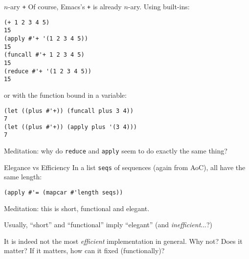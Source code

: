 \documentclass[presentation]{beamer}
\begin{document}
\begin{frame}[fragile]{$n$-ary \texttt{+}}
   Of course, Emacs's \texttt{+} is already $n$-ary.  Using built-ins:
\begin{verbatim}
(+ 1 2 3 4 5)
15
(apply #'+ '(1 2 3 4 5))
15
(funcall #'+ 1 2 3 4 5)
15
(reduce #'+ '(1 2 3 4 5))
15
\end{verbatim}
or with the function bound in a variable:
\begin{verbatim}
(let ((plus #'+)) (funcall plus 3 4))
7
(let ((plus #'+)) (apply plus '(3 4)))
7
\end{verbatim}

Meditation: why do \texttt{reduce} and \texttt{apply} seem to do exactly the same thing?

\end{frame}
\begin{frame}[fragile]{Elegance vs Efficiency}
In a list \texttt{seqs} of sequences (again from AoC), all have the same length:
\begin{verbatim}
(apply #'= (mapcar #'length seqs))
\end{verbatim}
\medskip

Meditation: this is short, functional and elegant.

\smallskip
Usually, ``short'' and ``functional'' imply ``elegant'' (and \emph{inefficient}...?)

\medskip
It is indeed not the most \emph{efficient} implementation in general.  Why not?  Does it matter?  If it matters, how can it fixed (functionally)?
\end{frame}
\end{document}
